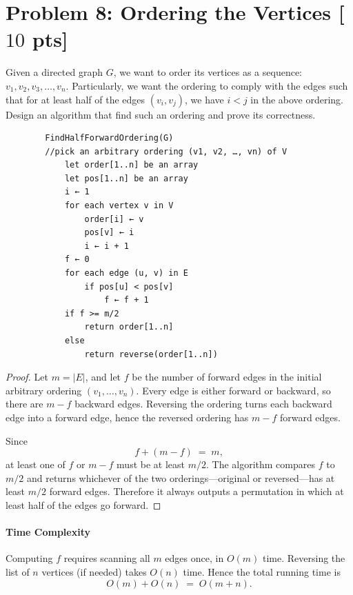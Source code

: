 \documentclass[letterpaper, 11pt]{article}
\newcommand{\1}{\mathds{1}}	%
\theoremstyle{definition}
\newcommand{\problem}[1]{\section*{Problem #1}}
\newenvironment{solution}{{\par\noindent\it Solution.}}{}
\begin{document}
\clearpage


\problem{8: Ordering the Vertices [$10$ pts]}
Given a directed graph $G$, we want to order its vertices as a sequence: $v_1, v_2, v_3, \ldots, v_n$. Particularly, we want the ordering to comply with the edges such that for at least half of the edges $(v_i, v_j)$, we have $i < j$ in the above ordering. Design an algorithm that find such an ordering and prove its correctness.
\begin{solution}
    \begin{lstlisting}
        FindHalfForwardOrdering(G)
        //pick an arbitrary ordering (v1, v2, …, vn) of V
            let order[1..n] be an array
            let pos[1..n] be an array
            i ← 1
            for each vertex v in V
                order[i] ← v
                pos[v] ← i
                i ← i + 1
            f ← 0
            for each edge (u, v) in E
                if pos[u] < pos[v]
                    f ← f + 1
            if f >= m/2
                return order[1..n]
            else
                return reverse(order[1..n])
        \end{lstlisting}
        \begin{proof}
            Let \(m = |E|\), and let \(f\) be the number of forward edges in the initial arbitrary ordering \((v_1,\dots,v_n)\).  Every edge is either forward or backward, so there are \(m-f\) backward edges.  Reversing the ordering turns each backward edge into a forward edge, hence the reversed ordering has \(m-f\) forward edges.
            
            Since
            \[
            f + (m - f) \;=\; m,
            \]
            at least one of \(f\) or \(m-f\) must be at least \(m/2\).  The algorithm compares \(f\) to \(m/2\) and returns whichever of the two orderings—original or reversed—has at least \(m/2\) forward edges.  Therefore it always outputs a permutation in which at least half of the edges go forward.
            \end{proof}
            
            \paragraph*{Time Complexity}
            Computing \(f\) requires scanning all \(m\) edges once, in \(O(m)\) time.  Reversing the list of \(n\) vertices (if needed) takes \(O(n)\) time.  Hence the total running time is
            \[
            O(m) + O(n) \;=\; O(m + n).
            \]
\end{solution}
\end{document}
